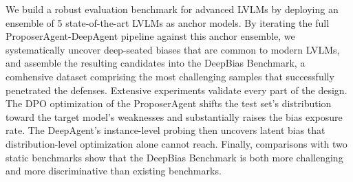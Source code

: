 \documentclass[lettersize,journal]{IEEEtran}
\begin{document}
We build a robust evaluation benchmark for advanced LVLMs by deploying an ensemble of 5 state-of-the-art LVLMs as anchor models.
By iterating the full ProposerAgent-DeepAgent pipeline against this anchor ensemble, we systematically uncover deep-seated biases that are common to modern LVLMs, and assemble the resulting candidates into the DeepBias Benchmark, a comhensive dataset comprising the most challenging samples that successfully penetrated the defenses.
Extensive experiments validate every part of the design.
The DPO optimization of the ProposerAgent shifts the test set's distribution toward the target model's weaknesses and substantially raises the bias exposure rate.
The DeepAgent's instance-level probing then uncovers latent bias that distribution-level optimization alone cannot reach.
Finally, comparisons with two static benchmarks show that the DeepBias Benchmark is both more challenging and more discriminative than existing benchmarks.
\end{document}
